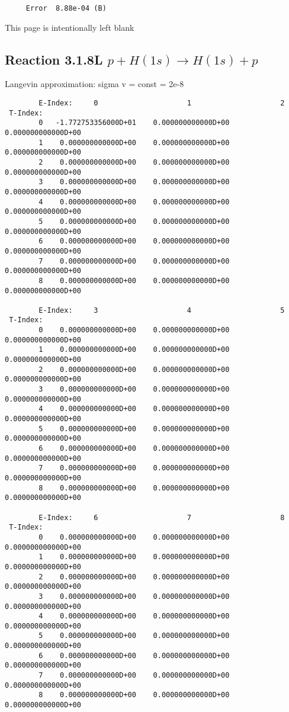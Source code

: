 \documentclass[12pt,dvipdfmx]{article}
\begin{document}
{\begin{small}
\begin{verbatim}
     Error  8.88e-04 (B)
\end{verbatim}\end{small}

\newpage
This page is intentionally left blank
\newpage


\subsection{
Reaction 3.1.8L $ p + H(1s) \rightarrow H(1s) + p   $
}

 Langevin approximation: sigma v = const = 2e-8


\begin{small}\begin{verbatim}
        E-Index:     0                     1                     2
 T-Index:
        0   -1.772753356000D+01    0.000000000000D+00    0.000000000000D+00
        1    0.000000000000D+00    0.000000000000D+00    0.000000000000D+00
        2    0.000000000000D+00    0.000000000000D+00    0.000000000000D+00
        3    0.000000000000D+00    0.000000000000D+00    0.000000000000D+00
        4    0.000000000000D+00    0.000000000000D+00    0.000000000000D+00
        5    0.000000000000D+00    0.000000000000D+00    0.000000000000D+00
        6    0.000000000000D+00    0.000000000000D+00    0.000000000000D+00
        7    0.000000000000D+00    0.000000000000D+00    0.000000000000D+00
        8    0.000000000000D+00    0.000000000000D+00    0.000000000000D+00

        E-Index:     3                     4                     5
 T-Index:
        0    0.000000000000D+00    0.000000000000D+00    0.000000000000D+00
        1    0.000000000000D+00    0.000000000000D+00    0.000000000000D+00
        2    0.000000000000D+00    0.000000000000D+00    0.000000000000D+00
        3    0.000000000000D+00    0.000000000000D+00    0.000000000000D+00
        4    0.000000000000D+00    0.000000000000D+00    0.000000000000D+00
        5    0.000000000000D+00    0.000000000000D+00    0.000000000000D+00
        6    0.000000000000D+00    0.000000000000D+00    0.000000000000D+00
        7    0.000000000000D+00    0.000000000000D+00    0.000000000000D+00
        8    0.000000000000D+00    0.000000000000D+00    0.000000000000D+00

        E-Index:     6                     7                     8
 T-Index:
        0    0.000000000000D+00    0.000000000000D+00    0.000000000000D+00
        1    0.000000000000D+00    0.000000000000D+00    0.000000000000D+00
        2    0.000000000000D+00    0.000000000000D+00    0.000000000000D+00
        3    0.000000000000D+00    0.000000000000D+00    0.000000000000D+00
        4    0.000000000000D+00    0.000000000000D+00    0.000000000000D+00
        5    0.000000000000D+00    0.000000000000D+00    0.000000000000D+00
        6    0.000000000000D+00    0.000000000000D+00    0.000000000000D+00
        7    0.000000000000D+00    0.000000000000D+00    0.000000000000D+00
        8    0.000000000000D+00    0.000000000000D+00    0.000000000000D+00


\end{verbatim}
\end{small}}
\end{document}
